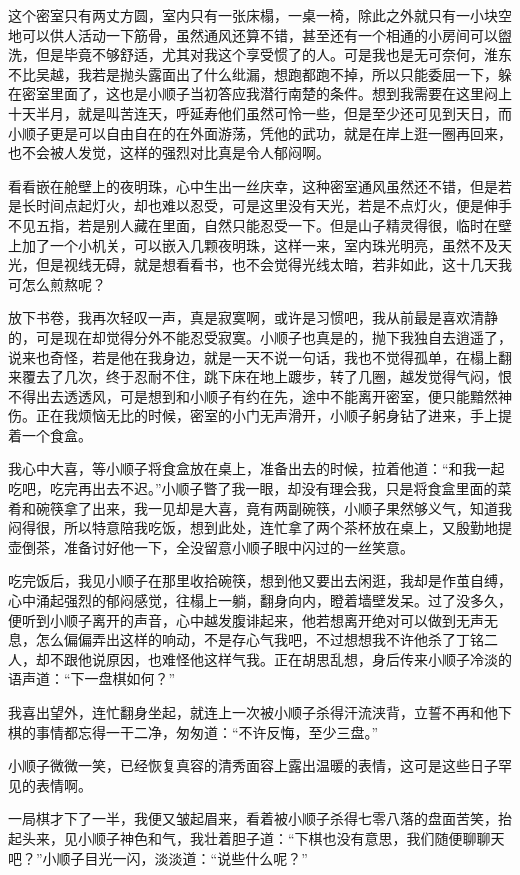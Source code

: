 这个密室只有两丈方圆，室内只有一张床榻，一桌一椅，除此之外就只有一小块空地可以供人活动一下筋骨，虽然通风还算不错，甚至还有一个相通的小房间可以盥洗，但是毕竟不够舒适，尤其对我这个享受惯了的人。可是我也是无可奈何，淮东不比吴越，我若是抛头露面出了什么纰漏，想跑都跑不掉，所以只能委屈一下，躲在密室里面了，这也是小顺子当初答应我潜行南楚的条件。想到我需要在这里闷上十天半月，就是叫苦连天，呼延寿他们虽然可怜一些，但是至少还可见到天日，而小顺子更是可以自由自在的在外面游荡，凭他的武功，就是在岸上逛一圈再回来，也不会被人发觉，这样的强烈对比真是令人郁闷啊。

看看嵌在舱壁上的夜明珠，心中生出一丝庆幸，这种密室通风虽然还不错，但是若是长时间点起灯火，却也难以忍受，可是这里没有天光，若是不点灯火，便是伸手不见五指，若是别人藏在里面，自然只能忍受一下。但是山子精灵得很，临时在壁上加了一个小机关，可以嵌入几颗夜明珠，这样一来，室内珠光明亮，虽然不及天光，但是视线无碍，就是想看看书，也不会觉得光线太暗，若非如此，这十几天我可怎么煎熬呢？

放下书卷，我再次轻叹一声，真是寂寞啊，或许是习惯吧，我从前最是喜欢清静的，可是现在却觉得分外不能忍受寂寞。小顺子也真是的，抛下我独自去逍遥了，说来也奇怪，若是他在我身边，就是一天不说一句话，我也不觉得孤单，在榻上翻来覆去了几次，终于忍耐不住，跳下床在地上踱步，转了几圈，越发觉得气闷，恨不得出去透透风，可是想到和小顺子有约在先，途中不能离开密室，便只能黯然神伤。正在我烦恼无比的时候，密室的小门无声滑开，小顺子躬身钻了进来，手上提着一个食盒。

我心中大喜，等小顺子将食盒放在桌上，准备出去的时候，拉着他道：“和我一起吃吧，吃完再出去不迟。”小顺子瞥了我一眼，却没有理会我，只是将食盒里面的菜肴和碗筷拿了出来，我一见却是大喜，竟有两副碗筷，小顺子果然够义气，知道我闷得很，所以特意陪我吃饭，想到此处，连忙拿了两个茶杯放在桌上，又殷勤地提壶倒茶，准备讨好他一下，全没留意小顺子眼中闪过的一丝笑意。

吃完饭后，我见小顺子在那里收拾碗筷，想到他又要出去闲逛，我却是作茧自缚，心中涌起强烈的郁闷感觉，往榻上一躺，翻身向内，瞪着墙壁发呆。过了没多久，便听到小顺子离开的声音，心中越发腹诽起来，他若想离开绝对可以做到无声无息，怎么偏偏弄出这样的响动，不是存心气我吧，不过想想我不许他杀了丁铭二人，却不跟他说原因，也难怪他这样气我。正在胡思乱想，身后传来小顺子冷淡的语声道：“下一盘棋如何？”

我喜出望外，连忙翻身坐起，就连上一次被小顺子杀得汗流浃背，立誓不再和他下棋的事情都忘得一干二净，匆匆道：“不许反悔，至少三盘。”

小顺子微微一笑，已经恢复真容的清秀面容上露出温暖的表情，这可是这些日子罕见的表情啊。

一局棋才下了一半，我便又皱起眉来，看着被小顺子杀得七零八落的盘面苦笑，抬起头来，见小顺子神色和气，我壮着胆子道：“下棋也没有意思，我们随便聊聊天吧？”小顺子目光一闪，淡淡道：“说些什么呢？”

